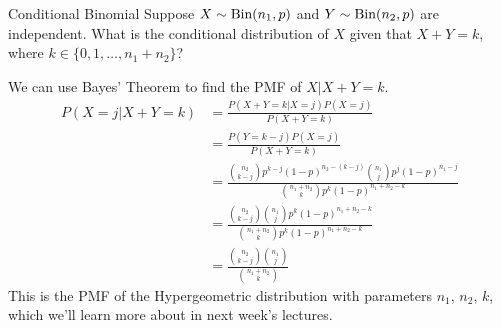 \documentclass[11pt]{article}
\begin{document}
\begin{exercise}{Conditional Binomial}
Suppose $X \sim \textrm{Bin}(n_1, p)$ and $Y \sim \textrm{Bin}(n_2, p)$ are independent. What is the conditional distribution of $X$ given that $X + Y = k$, where $k \in \{0, 1, \ldots, n_1 + n_2\}$?
\end{exercise}

\begin{solution}{3}
We can use Bayes' Theorem to find the PMF of $X | X + Y = k$.
\begin{align*}
P(X = j | X + Y = k) &= \frac{P(X + Y = k | X = j)P(X = j)}{P(X + Y = k)} \\
&= \frac{P(Y = k - j)P(X = j)}{P(X + Y = k)} \\
&= \frac{\binom{n_2}{k - j}p^{k - j}(1 - p)^{n_2 - (k - j)}\binom{n_1}{j}p^j(1 - p)^{n_1 - j}}{\binom{n_1 + n_2}{k}p^k(1 - p)^{n_1 + n_2 - k}} \\
&= \frac{\binom{n_2}{k - j}\binom{n_1}{j}p^k(1 - p)^{n_1 + n_2 - k}}{\binom{n_1 + n_2}{k}p^k(1 - p)^{n_1 + n_2 - k}} \\
&= \frac{\binom{n_2}{k - j}\binom{n_1}{j}}{\binom{n_1 + n_2}{k}}
\end{align*}
This is the PMF of the Hypergeometric distribution with parameters $n_1$, $n_2$, $k$, which we'll learn more about in next week's lectures.
\end{solution}
\end{document}
